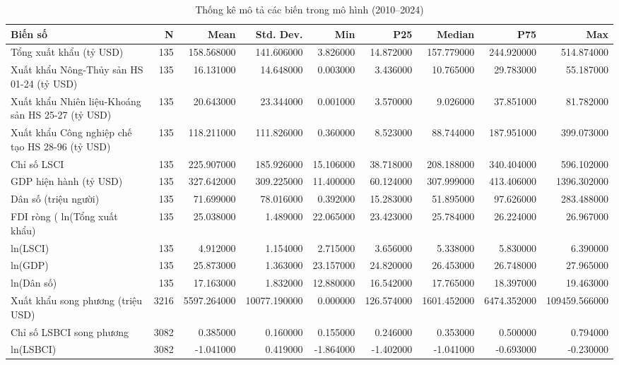 \begin{table}
\caption{Thống kê mô tả các biến trong mô hình (2010--2024)}
\label{tab:desc_stats}
\begin{tabular}{lrrrrrrrr}
\toprule
Biến số & N & Mean & Std. Dev. & Min & P25 & Median & P75 & Max \\
\midrule
Tổng xuất khẩu (tỷ USD) & 135 & 158.568000 & 141.606000 & 3.826000 & 14.872000 & 157.779000 & 244.920000 & 514.874000 \\
Xuất khẩu Nông-Thủy sản HS 01-24 (tỷ USD) & 135 & 16.131000 & 14.648000 & 0.003000 & 3.436000 & 10.765000 & 29.783000 & 55.187000 \\
Xuất khẩu Nhiên liệu-Khoáng sản HS 25-27 (tỷ USD) & 135 & 20.643000 & 23.344000 & 0.001000 & 3.570000 & 9.026000 & 37.851000 & 81.782000 \\
Xuất khẩu Công nghiệp chế tạo HS 28-96 (tỷ USD) & 135 & 118.211000 & 111.826000 & 0.360000 & 8.523000 & 88.744000 & 187.951000 & 399.073000 \\
Chỉ số LSCI & 135 & 225.907000 & 185.926000 & 15.106000 & 38.718000 & 208.188000 & 340.404000 & 596.102000 \\
GDP hiện hành (tỷ USD) & 135 & 327.642000 & 309.225000 & 11.400000 & 60.124000 & 307.999000 & 413.406000 & 1396.302000 \\
Dân số (triệu người) & 135 & 71.699000 & 78.016000 & 0.392000 & 15.283000 & 51.895000 & 97.626000 & 283.488000 \\
FDI ròng (%
ln(Tổng xuất khẩu) & 135 & 25.038000 & 1.489000 & 22.065000 & 23.423000 & 25.784000 & 26.224000 & 26.967000 \\
ln(LSCI) & 135 & 4.912000 & 1.154000 & 2.715000 & 3.656000 & 5.338000 & 5.830000 & 6.390000 \\
ln(GDP) & 135 & 25.873000 & 1.363000 & 23.157000 & 24.820000 & 26.453000 & 26.748000 & 27.965000 \\
ln(Dân số) & 135 & 17.163000 & 1.832000 & 12.880000 & 16.542000 & 17.765000 & 18.397000 & 19.463000 \\
Xuất khẩu song phương (triệu USD) & 3216 & 5597.264000 & 10077.190000 & 0.000000 & 126.574000 & 1601.452000 & 6474.352000 & 109459.566000 \\
Chỉ số LSBCI song phương & 3082 & 0.385000 & 0.160000 & 0.155000 & 0.246000 & 0.353000 & 0.500000 & 0.794000 \\
ln(LSBCI) & 3082 & -1.041000 & 0.419000 & -1.864000 & -1.402000 & -1.041000 & -0.693000 & -0.230000 \\
\bottomrule
\end{tabular}
\end{table}
